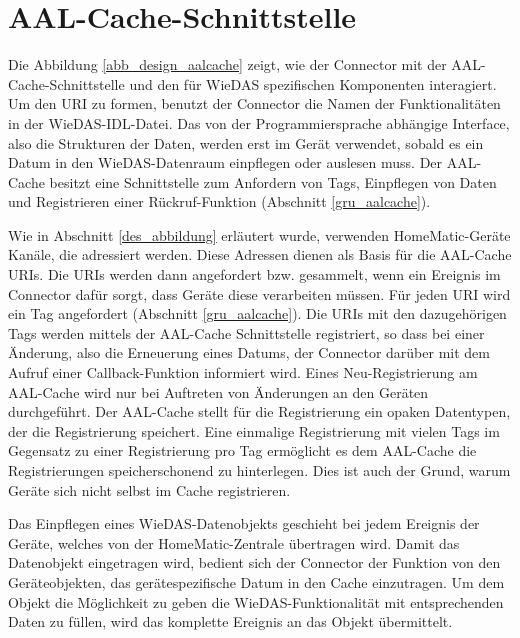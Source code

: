 
\section{AAL-Cache-Schnittstelle}
\label{des_aalcache}


Die Abbildung \ref{abb_design_aalcache} zeigt, wie der Connector mit der AAL-Cache-Schnittstelle
und den für WieDAS spezifischen Komponenten interagiert.
Um den URI zu formen, benutzt der Connector die Namen der Funktionalitäten in der WieDAS-IDL-Datei.
Das von der Programmiersprache abhängige Interface, also die Strukturen der Daten, werden erst
im Gerät verwendet, sobald es ein Datum in den WieDAS-Datenraum einpflegen oder auslesen muss.
Der AAL-Cache besitzt eine Schnittstelle zum Anfordern von Tags, Einpflegen von Daten und Registrieren
einer Rückruf-Funktion (Abschnitt \ref{gru_aalcache}).

Wie in Abschnitt \ref{des_abbildung} erläutert wurde, verwenden HomeMatic-Geräte Kanäle, die adressiert
werden.
Diese Adressen dienen als Basis für die AAL-Cache URIs.
Die URIs werden dann angefordert bzw. gesammelt, wenn ein Ereignis im Connector dafür sorgt, dass Geräte
diese verarbeiten müssen.
Für jeden URI wird ein Tag angefordert (Abschnitt \ref{gru_aalcache}).
Die URIs mit den dazugehörigen Tags werden mittels der AAL-Cache Schnittstelle registriert, so dass bei einer
Änderung, also die Erneuerung eines Datums, der Connector darüber mit dem Aufruf einer Callback-Funktion
informiert wird.
Eines Neu-Registrierung am AAL-Cache wird nur bei Auftreten von Änderungen an den Geräten durchgeführt.
Der AAL-Cache stellt für die Registrierung ein opaken Datentypen, der die Registrierung speichert.
Eine einmalige Registrierung mit vielen Tags im Gegensatz zu einer Registrierung pro Tag ermöglicht
es dem AAL-Cache die Registrierungen speicherschonend zu hinterlegen.
Dies ist auch der Grund, warum Geräte sich nicht selbst im Cache registrieren.

Das Einpflegen eines WieDAS-Datenobjekts geschieht bei jedem Ereignis der Geräte, welches
von der HomeMatic-Zentrale übertragen wird.
Damit das Datenobjekt eingetragen wird, bedient sich der Connector der Funktion von den Geräteobjekten,
das gerätespezifische Datum in den Cache einzutragen.
Um dem Objekt die Möglichkeit zu geben die WieDAS-Funktionalität mit entsprechenden Daten zu füllen,
wird das komplette Ereignis an das Objekt übermittelt.

